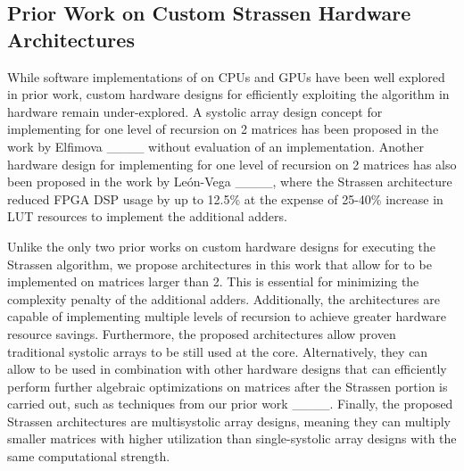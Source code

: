 \subsection{Prior Work on Custom Strassen Hardware Architectures}
\label{background:sec:smm}
While software implementations of \sa on CPUs and GPUs have been well explored in prior work, custom hardware designs for efficiently exploiting the algorithm in hardware remain under-explored.
A systolic array design concept for implementing \sa for one level of recursion on 2 matrices has been proposed in the work by Elfimova \ea ____ without evaluation of an implementation.
Another hardware design for implementing \sa for one level of recursion on 2 matrices has also been proposed in the work by León-Vega \ea ____, where the Strassen architecture reduced FPGA DSP usage by up to 12.5\% at the expense of 25-40\% increase in LUT resources to implement the additional adders.

Unlike the only two prior works on custom hardware designs for executing the Strassen algorithm, we propose architectures in this work that allow for \sa to be implemented on matrices larger than 2.
This is essential for minimizing the complexity penalty of the additional adders.
Additionally, the architectures are capable of implementing multiple levels of \s recursion to achieve greater hardware resource savings.
Furthermore, the proposed architectures allow proven traditional systolic arrays to be still used at the core.
Alternatively, they can allow \sa to be used in combination with other hardware designs that can efficiently perform further algebraic optimizations on matrices after the Strassen portion is carried out, such as techniques from our prior work ____.
Finally, the proposed Strassen architectures are multisystolic array designs, meaning they can multiply smaller matrices with higher utilization than single-systolic array designs with the same computational strength.

